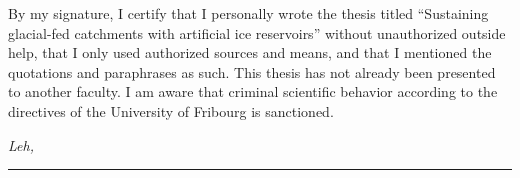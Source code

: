 %
\label{sec:declaration}
\thispagestyle{empty}
By my signature, I certify that I personally wrote the thesis titled “Sustaining glacial-fed catchments with artificial ice reservoirs” without unauthorized outside help, that I only used authorized sources and means, and that I mentioned the quotations and paraphrases as such. This thesis has not already been presented to another faculty. I am aware that criminal scientific behavior according to the directives of the University of Fribourg is sanctioned.

\bigskip

\noindent\textit{Leh, \thesisDate}

\smallskip

\begin{flushright}
	\begin{minipage}{5cm}
		\rule{\textwidth}{1pt}
		\centering\thesisName
	\end{minipage}
\end{flushright}


